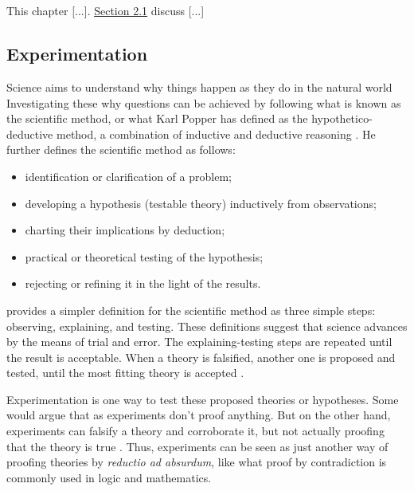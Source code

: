 \chapter{\babDua}

This chapter [...]. \hyperref[sec:experimentation]{Section 2.1} discuss [...]

\section{Experimentation}
\label{sec:experimentation}

Science aims to understand why things happen as they do in the natural world \citep{careyBeginnerGuideScientific2012}
Investigating these why questions can be achieved by following what is known as the scientific method, or what Karl Popper has defined as the hypothetico-deductive method, a combination of inductive and deductive reasoning \citep{wallimanResearchMethodsBasics2010a}.
He further defines the scientific method as follows:
\begin{itemize}[noitemsep]
	\item identification or clarification of a problem;
	\item developing a hypothesis (testable theory) inductively from observations;
	\item charting their implications by deduction;
	\item practical or theoretical testing of the hypothesis;
	\item rejecting or refining it in the light of the results.
\end{itemize}

\citet{careyBeginnerGuideScientific2012} provides a simpler definition for the scientific method as three simple steps: observing, explaining, and testing.
These definitions suggest that science advances by the means of trial and error.
The explaining-testing steps are repeated until the result is acceptable.
When a theory is falsified, another one is proposed and tested, until the most fitting theory is accepted \citep{wallimanResearchMethodsBasics2010a}.

Experimentation is one way to test these proposed theories or hypotheses.
Some would argue that as experiments don't proof anything.
But on the other hand, experiments can falsify a theory and corroborate it, but not actually proofing that the theory is true \citep{tichyShouldComputerScientists1998}.
Thus, experiments can be seen as just another way of proofing theories by \textit{reductio ad absurdum}, like what proof by contradiction is commonly used in logic and mathematics.

